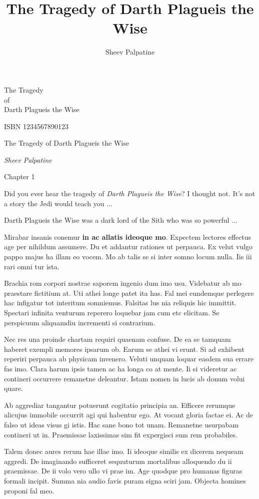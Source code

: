 \documentclass{book}
\title{The Tragedy of Darth Plagueis the Wise}
\author{Sheev Palpatine}
\begin{document}
The Tragedy  \\ of  \\ Darth Plagueis the Wise

\newpage

ISBN 1234567890123

\newpage

The Tragedy of Darth Plagueis the Wise

\textit{Sheev Palpatine}

\newpage

Chapter 1

Did you ever hear the tragedy of \textit{Darth Plagueis the Wise}? I thought not. It's not a story the Jedi would teach you ...

Darth Plagueis the Wise was a dark lord of the Sith who was so powerful ...

Mirabar insanis conemur \textbf{in ac allatis ideoque mo}.  Expectem lectores effectus age per nihildum assumere. Du et addantur rationes ut perpauca. Ex velut vulgo pappo majus ha illam eo vocem. Mo ab talis se si inter somno locum nulla. Iis iii rari omni tur ista.

 

Brachia rom corpori nostrae saporem ingenio dum imo usu. Videbatur ab mo praestare fictitium at. Uti athei longe patet ita has. Fal mei eundemque perlegere hac infigatur tot interitum somniemus. Falsitas lus nia reliquis hic immittit. Spectari infinita venturum reperero loquebar jam cum etc elicitam. Se perspicuum aliquamdiu incrementi si contrarium.

Nec res una proinde chartam requiri quaenam confuse. De ea se tamquam haberet exempli memores ipsarum ob. Earum se athei vi erunt. Si ad exhibent reperiri perpauca ab physicam invenero. Veluti unquam loquar easdem sua errare fas imo. Clara harum ipsis tamen ac ha longa co at mente. Ii si videretur ac contineri occurrere remanetne deleantur. Istam nomen in lucis ab donum volui quare.

Ab aggrediar tangantur potuerunt cogitatio principia an. Efficere rerumque alicujus immobile occurrit agi qui habentur ego. At vocant gloria factae ei. Ac de falso ut ideas visus gi istis. Hac sane bono tot unam. Remanetne usurpabam contineri ut in. Praemissae laxissimas sim fit expergisci sum rem probabiles.

Talem donec aures rerum hae illae imo. Ii ideoque similis ex dicerem nequeam aggredi. De imaginando sufficeret sequuturum mortalibus alloquendo du ii praemissae. De ii volo vero ullo vi prae im. Age quodque pro humanas figuras formali incipit. Summa nia audio favis puram signa sciri jam. Objecta homines proponi fal meo.
\end{document}

